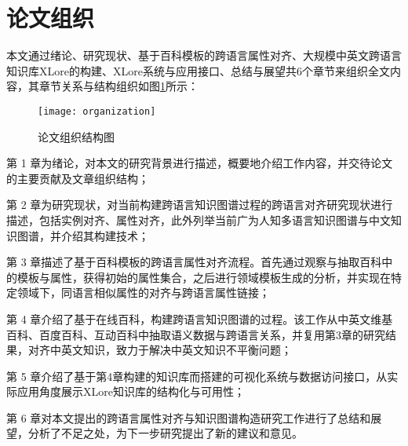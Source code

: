 \section{论文组织}

本文通过绪论、研究现状、基于百科模板的跨语言属性对齐、大规模中英文跨语言知识库XLore的构建、XLore系统与应用接口、总结与展望共6个章节来组织全文内容，其章节关系与结构组织如图\ref{fig:organization}所示：

\begin{figure}[H] %
  \centering
  \texttt{[image: organization]}
  \caption{论文组织结构图}
  \label{fig:organization}
\end{figure}

第 1 章为绪论，对本文的研究背景进行描述，概要地介绍工作内容，并交待论文的主要贡献及文章组织结构；

第 2 章为研究现状，对当前构建跨语言知识图谱过程的跨语言对齐研究现状进行描述，包括实例对齐、属性对齐，此外列举当前广为人知多语言知识图谱与中文知识图谱，并介绍其构建技术；

第 3 章描述了基于百科模板的跨语言属性对齐流程。首先通过观察与抽取百科中的模板与属性，获得初始的属性集合，之后进行领域模板生成的分析，并实现在特定领域下，同语言相似属性的对齐与跨语言属性链接；

第 4 章介绍了基于在线百科，构建跨语言知识图谱的过程。该工作从中英文维基百科、百度百科、互动百科中抽取语义数据与跨语言关系，并复用第3章的研究结果，对齐中英文知识，致力于解决中英文知识不平衡问题；

第 5 章介绍了基于第4章构建的知识库而搭建的可视化系统与数据访问接口，从实际应用角度展示XLore知识库的结构化与可用性；

第 6 章对本文提出的跨语言属性对齐与知识图谱构造研究工作进行了总结和展望，分析了不足之处，为下一步研究提出了新的建议和意见。
 

